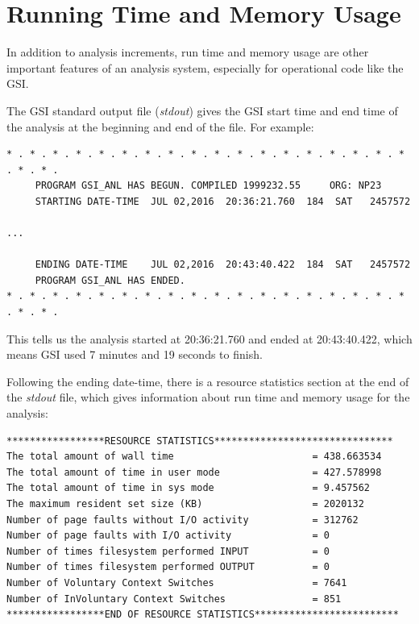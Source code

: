 \section{Running Time and Memory Usage}

In addition to analysis increments, run time and memory usage are other important features of an analysis system, especially for operational code like the GSI.
 
The GSI standard output file (\textit{stdout}) gives the GSI start time and end time of the analysis at the beginning and end of the file. For example:

\begin{scriptsize}
\begin{verbatim}
* . * . * . * . * . * . * . * . * . * . * . * . * . * . * . * . * . * . * . * .
     PROGRAM GSI_ANL HAS BEGUN. COMPILED 1999232.55     ORG: NP23
     STARTING DATE-TIME  JUL 02,2016  20:36:21.760  184  SAT   2457572

...
 
     ENDING DATE-TIME    JUL 02,2016  20:43:40.422  184  SAT   2457572
     PROGRAM GSI_ANL HAS ENDED.
* . * . * . * . * . * . * . * . * . * . * . * . * . * . * . * . * . * . * . * .
\end{verbatim}
\end{scriptsize}

This tells us the analysis started at 20:36:21.760 and ended at 20:43:40.422, which means GSI used 7 minutes and 19 seconds to finish.

Following the ending date-time, there is a resource statistics section at the end of the \textit{stdout} file, which gives information about run time and memory usage for the analysis:

\begin{scriptsize}
\begin{verbatim}
*****************RESOURCE STATISTICS*******************************
The total amount of wall time                        = 438.663534
The total amount of time in user mode                = 427.578998
The total amount of time in sys mode                 = 9.457562
The maximum resident set size (KB)                   = 2020132
Number of page faults without I/O activity           = 312762
Number of page faults with I/O activity              = 0
Number of times filesystem performed INPUT           = 0
Number of times filesystem performed OUTPUT          = 0
Number of Voluntary Context Switches                 = 7641
Number of InVoluntary Context Switches               = 851
*****************END OF RESOURCE STATISTICS*************************
\end{verbatim}
\end{scriptsize}

